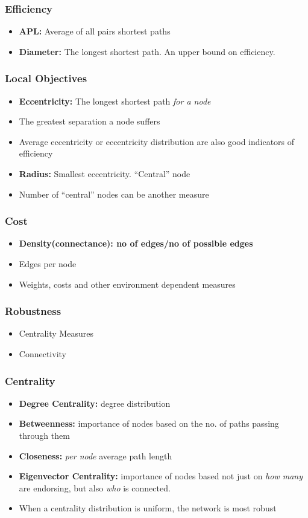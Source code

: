 \documentclass{beamer}
\begin{document}
	\frame
	{
		\frametitle{Efficiency}
			\begin{itemize}
				\item<1-> {\textbf{APL:} Average of all pairs shortest paths}
				\item<2-> {\textbf{Diameter:} The longest shortest path. An upper bound on efficiency.}				
			\end{itemize}
		
	}	

	\frame
	{
		\frametitle{Local Objectives}
		\begin{itemize}
			\item<1-> {\textbf{Eccentricity: } The longest shortest path \textit{for a node}}
			\item<2-> {The greatest separation a node suffers}
			\item<3-> {Average eccentricity or eccentricity distribution are also good indicators of efficiency}
			\item<4-> {\textbf{Radius:} Smallest eccentricity. ``Central'' node}
			\item<5-> {Number of ``central'' nodes can be another measure}
		\end{itemize}
	}
\frame
	{
		\frametitle{Cost}
			\begin{itemize}
				\item<1-> {\textbf{Density(connectance): no of edges/no of possible edges} }
				\item<2-> {Edges per node}
				\item<3-> {Weights, costs and other environment dependent measures}
			\end{itemize}
	}

	\frame
	{
		\frametitle{Robustness}
			\begin{itemize}
				\item<1-> {Centrality Measures}
				\item<2-> {Connectivity}
			\end{itemize}
	}

	\frame
	{
		\frametitle{Centrality}
			\begin{itemize}
				\item<1-> {\textbf{Degree Centrality:} degree distribution}
				\item<2-> {\textbf{Betweenness:} importance of nodes based on the no. of paths passing through them}
				\item<3-> {\textbf{Closeness:} \textit{per node} average path length}
				\item<4-> {\textbf{Eigenvector Centrality:} importance of nodes based not just on \textit{how many} are endorsing, but also \textit{who} is connected.}
				\item<5-> {When a centrality distribution is uniform, the network is most robust}
			\end{itemize}
	}
\end{document}
